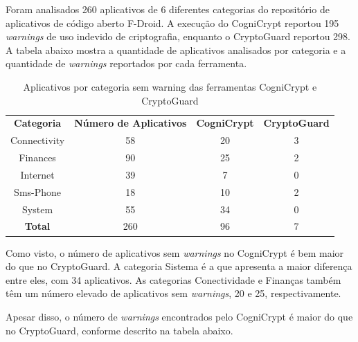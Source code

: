 Foram analisados 260 aplicativos de 6 diferentes categorias do repositório de aplicativos de código aberto F-Droid. A execução do CogniCrypt reportou 195 \textit{warnings} de uso indevido de criptografia, enquanto o CryptoGuard reportou 298. A tabela abaixo mostra a quantidade de aplicativos analisados por categoria e a quantidade de \textit{warnings} reportados por cada ferramenta.

\begin{table}[!htbp]
  \centering
  \begin{tabular}{|c|c|c|c|}
  
    \textbf{Categoria}   & \textbf{Número de Aplicativos}   &  \textbf{CogniCrypt}     &  \textbf{CryptoGuard} \\ 
     Connectivity           & \num{58}                         &  \num{20}                    & \num{3}                     \\
Finances                & \num{90}                         &  \num{25}                    & \num{2}                     \\
Internet                 & \num{39}                         &  \num{7}                      &     \num{0}                  \\
Sms-Phone            & \num{18}                         &  \num{10}                     &     \num{2}                 \\
System                  & \num{55}                        &   \num{34}                    &     \num{0}                  \\
\textbf{Total}        & \num{260}                      &   \num{96}                  &     \num{7}                   \\
\end{tabular}
    
  \caption{Aplicativos por categoria sem warning das ferramentas CogniCrypt e CryptoGuard}
\label{AplicativosSemWarning}
\end{table}

Como visto, o número de aplicativos sem \textit{warnings} no CogniCrypt é bem maior do que no CryptoGuard. A categoria Sistema é a que apresenta a maior diferença entre eles, com \num{34} aplicativos. As categorias Conectividade e Finanças também têm um número elevado de aplicativos sem \textit{warnings}, \num{20} e \num{25}, respectivamente.

Apesar disso, o número de \textit{warnings} encontrados pelo CogniCrypt é maior do que no CryptoGuard, conforme descrito na tabela abaixo.

